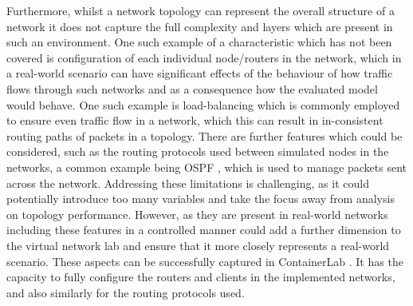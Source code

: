 Furthermore, whilst a network topology can represent the overall structure of a network it does not capture the full complexity and layers which are present in such an environment. One such example of a characteristic which has not been covered is configuration of each individual node/routers in the network, which in a real-world scenario can have significant effects of the behaviour of how traffic flows through such networks and as a consequence how the evaluated model would behave. One such example is load-balancing which is commonly employed to ensure even traffic flow in a network, which this can result in in-consistent routing paths of packets in a topology. There are further features which could be considered, such as the routing protocols used between simulated nodes in the networks, a common example being OSPF \cite{OSPF_new}, which is used to manage packets sent across the network. Addressing these limitations is challenging, as it could potentially introduce too many variables and take the focus away from analysis on topology performance. However, as they are present in real-world networks including these features in a controlled manner could add a further dimension to the virtual network lab and ensure that it more closely represents a real-world scenario. These aspects can be successfully captured in ContainerLab \cite{containerlab} . It has the capacity to fully configure the routers and clients in the implemented networks, and also similarly for the routing protocols used. 

